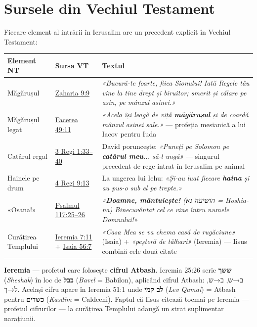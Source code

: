 \documentclass[12pt,a4paper,twoside,openany]{book}
\begin{document}
\section{Sursele din Vechiul Testament}

Fiecare element al intrării în Ierusalim are un precedent explicit în Vechiul Testament:

\begin{center}
\small
\begin{tabularx}{\textwidth}{L{2.5cm}L{3cm}X}
\toprule
{}
\textbf{Element NT} & \textbf{Sursa VT} & \textbf{Textul} \\
\midrule
Măgărușul & \href{https://bibliaortodoxa.ro/carte.php?id=82\&cap=9\#9}{Zaharia 9:9} & \textit{«Bucură-te foarte, fiica Sionului! Iată Regele tău vine la tine drept și biruitor; smerit și călare pe asin, pe mânzul asinei.»} \\
Măgărușul legat & \href{https://bibliaortodoxa.ro/carte.php?id=25\&cap=49\#11}{Facerea 49:11} & \textit{«Acela își leagă de viță \textbf{măgărușul} și de coardă mânzul asinei sale.»} — profeția mesianică a lui Iacov pentru Iuda \\
Catârul regal & \href{https://bibliaortodoxa.ro/carte.php?id=68\&cap=1\#33}{3 Regi 1:33--40} & David poruncește: \textit{«Puneți pe Solomon pe \textbf{catârul meu}... să-l ungă»} — singurul precedent de rege intrat în Ierusalim pe animal \\
Hainele pe drum & \href{https://bibliaortodoxa.ro/carte.php?id=69\&cap=9\#13}{4 Regi 9:13} & La ungerea lui Iehu: \textit{«Și-au luat fiecare \textbf{haina} și au pus-o sub el pe trepte.»} \\
«Osana!» & \href{https://bibliaortodoxa.ro/carte.php?id=65\&cap=117\#25}{Psalmul 117:25--26} & \textit{«\textbf{Doamne, mântuiește!} (הושיעה נא = Hoshia-na) Binecuvântat cel ce vine întru numele Domnului!»} \\
Curățirea Templului & \href{https://bibliaortodoxa.ro/carte.php?id=31\&cap=7\#11}{Ieremia 7:11} + \href{https://bibliaortodoxa.ro/carte.php?id=43\&cap=56\#7}{Isaia 56:7} & \textit{«Casa Mea se va chema casă de rugăciune»} (Isaia) + \textit{«peșteră de tâlhari»} (Ieremia) — Iisus combină cele două citate \\
\bottomrule
\end{tabularx}
\end{center}

\textbf{Ieremia} — profetul care folosește \textbf{cifrul Atbash}. Ieremia 25:26 scrie \textbf{ששך} (\textit{Sheshak}) în loc de \textbf{בבל} (\textit{Bavel} = Babilon), aplicând cifrul Atbash: ב→ש, ב→ש, ל→ך. Același cifru apare în Ieremia 51:1 unde \textbf{לב קמי} (\textit{Lev Qamai}) = Atbash pentru \textbf{כשדים} (\textit{Kasdim} = Caldeeni). Faptul că Iisus citează tocmai pe Ieremia — profetul cifrurilor — la curățirea Templului adaugă un strat suplimentar narațiunii.
\end{document}
